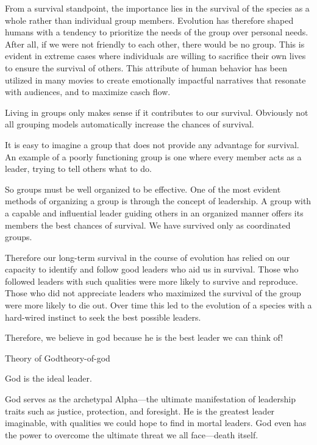 From a survival standpoint, the importance lies in the survival of
the species as a whole rather than individual group members.
Evolution has therefore shaped humans with a tendency to prioritize
the needs of the group over personal needs. After all, if we were
not friendly to each other, there would be no group. This is
evident in extreme cases where individuals are willing to sacrifice
their own lives to ensure the survival of others. This attribute of
human behavior has been utilized in many movies to create
emotionally impactful narratives that resonate with audiences, and
to maximize casch flow.

Living in groups only makes sense if it contributes to our
survival. Obviously not all grouping models automatically increase
the chances of survival.

It is easy to imagine a group that does not provide any advantage
for survival. An example of a poorly functioning group is one where
every member acts as a leader, trying to tell others what to do.

So groups must be well organized to be effective. One of the most
evident methods of organizing a group is through the concept of
leadership. A group with a capable and influential leader guiding
others in an organized manner offers its members the best chances
of survival. We have survived only as coordinated groups.

Therefore our long-term survival in the course of evolution has
relied on our capacity to identify and follow good leaders who aid
us in survival. Those who followed leaders with such qualities were
more likely to survive and reproduce. Those who did not appreciate
leaders who maximized the survival of the group were more likely
to die out. Over time this led to the evolution of a species with a
hard-wired instinct to seek the best possible leaders.

Therefore, we believe in god because he is the best leader we can think of!

\begin{principle}{Theory of God}{theory-of-god}

God is the ideal leader.

\end{principle}

God serves as the archetypal Alpha—the ultimate manifestation of leadership traits such as justice, protection, and foresight. He is the greatest leader imaginable, with qualities we could hope to find in mortal leaders. God even has the power to overcome the ultimate threat we all face—death itself.




